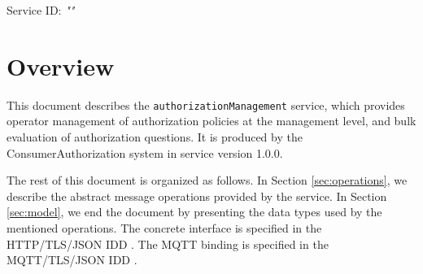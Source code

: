 \documentclass[a4paper]{arrowhead}
\begin{document}
\sloppy

\ArrowheadSetup

\begin{center}
  \vspace*{1cm}
  \huge{\arrowtitle}

  \vspace*{0.2cm}
  \LARGE{\arrowtype}
  \vspace*{1cm}

  \Large{Service ID: \textit{"\arrowid"}}

  \vspace*{\fill}


  \vspace*{1cm}
  \vspace*{\fill}

  \begin{abstract}
    This document describes the \texttt{authorization\allowbreak{}Management} service, version 1.0.0, produced by the ConsumerAuthorization core system of Arrowhead 5.2.2.
  \end{abstract}

  \vspace*{1cm}
\end{center}

\newpage

\tableofcontents
\newpage

\section{Overview}
\label{sec:overview}

This document describes the \texttt{authorization\allowbreak{}Management} service, which provides operator management of authorization policies at the management level, and bulk evaluation of authorization questions.
It is produced by the ConsumerAuthorization system \cite{ca-sysd} in service version 1.0.0.

The rest of this document is organized as follows.
In Section \ref{sec:operations}, we describe the abstract message operations provided by the service.
In Section \ref{sec:model}, we end the document by presenting the data types used by the mentioned operations.
The concrete interface is specified in the HTTP/TLS/JSON IDD \cite{ca-authorizationManagement-http-idd}. The MQTT binding is specified in the MQTT/TLS/JSON IDD \cite{ca-authorizationManagement-mqtt-idd}.
\end{document}
